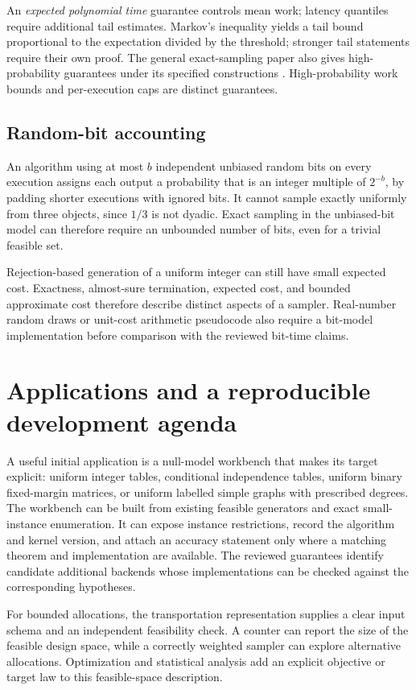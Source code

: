 \documentclass[11pt]{article}
\begin{document}
An \emph{expected polynomial time} guarantee controls mean work; latency quantiles require additional tail estimates. Markov's inequality yields a tail bound proportional to the expectation divided by the threshold; stronger tail statements require their own proof. The general exact-sampling paper also gives high-probability guarantees under its specified constructions \cite{GLMP2024}. High-probability work bounds and per-execution caps are distinct guarantees.

\subsection{Random-bit accounting}
An algorithm using at most \(b\) independent unbiased random bits on every execution assigns each output a probability that is an integer multiple of \(2^{-b}\), by padding shorter executions with ignored bits. It cannot sample exactly uniformly from three objects, since \(1/3\) is not dyadic. Exact sampling in the unbiased-bit model can therefore require an unbounded number of bits, even for a trivial feasible set.

Rejection-based generation of a uniform integer can still have small expected cost. Exactness, almost-sure termination, expected cost, and bounded approximate cost therefore describe distinct aspects of a sampler. Real-number random draws or unit-cost arithmetic pseudocode also require a bit-model implementation before comparison with the reviewed bit-time claims.

\section{Applications and a reproducible development agenda}
A useful initial application is a null-model workbench that makes its target explicit: uniform integer tables, conditional independence tables, uniform binary fixed-margin matrices, or uniform labelled simple graphs with prescribed degrees. The workbench can be built from existing feasible generators and exact small-instance enumeration. It can expose instance restrictions, record the algorithm and kernel version, and attach an accuracy statement only where a matching theorem and implementation are available. The reviewed guarantees identify candidate additional backends whose implementations can be checked against the corresponding hypotheses.

For bounded allocations, the transportation representation supplies a clear input schema and an independent feasibility check. A counter can report the size of the feasible design space, while a correctly weighted sampler can explore alternative allocations. Optimization and statistical analysis add an explicit objective or target law to this feasible-space description.
\end{document}
